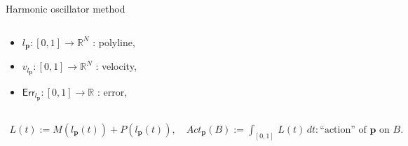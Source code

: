 \documentclass[aspectratio=169, bigfiles, professionalfonts, hyperref={colorlinks=true, allcolors=., urlcolor=blue}]{beamer}
\newcommand{\err}{\mathsf{Err}}
\newcommand{\R}{\mathbb{R}}
\begin{document}
\begin{frame}{Harmonic oscillator method}
\begin{columns}[t]
\begin{column}{0.5\textwidth}
\begin{center}
\end{center}
\vspace{-3mm}
\begin{itemize}
    \item
    $l_{\textbf{p}}:[0,1]\to\R^{N}$ : polyline,
    \item
    $v_{l_{\textbf{p}}}:[0,1]\to\R^{N}$ : velocity,
    \item
    $\err_{l_{\textbf{p}}}:[0,1]\to\R$ : error,
\end{itemize}
\end{column}
\end{columns}
\begin{tcolorbox}[colframe=yellow,
colback=yellow!10!white,
colbacktitle=yellow!40!white,
coltitle=black, fonttitle=\bfseries]
\vspace{-6.5mm}
    \begin{align*}
        L(t):=M(l_{\textbf{p}}(t))+P(l_{\textbf{p}}(t)),\quad Act_{\textbf{p}}(B) := \int_{[0,1]}\,L(t)\,dt : \text{``action'' of $\mathbf{p}$ on $B$}.
    \end{align*}
    \vspace{-7mm}
\end{tcolorbox}
\end{frame}
\end{document}
